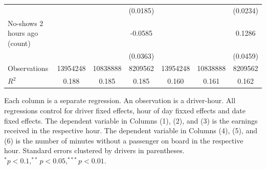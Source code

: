\documentclass[reviewmode]{AEA}
\begin{document}
\begin{table}
{\begin{tabular}{l*{6}{S}}
			                    &                     &                     &    (0.0185)         &                     &                     &    (0.0234)         \\
			\addlinespace
			No-shows 2 hours ago (count)&                     &                     &     -0.0585         &                     &                     &      0.1286\\
			                    &                     &                     &    (0.0363)         &                     &                     &    (0.0459)         \\
			\midrule
			Observations        &\num{13954248}         &\num{10838888}         &\num{8209562}         &\num{13954248}         &\num{10838888}         &\num{8209562}         \\
			$R^2$             &     {0.188}         &     {0.185}         &     {0.185}         &     {0.160}         &     {0.161}         &     {0.162}         \\
			\bottomrule
			\end{tabular}
			}

			\begin{tablenotes}
				Each column is a separate regression. An observation is a driver-hour. All regressions control for driver fixed effects, hour of day fixxed effects and date fixed effects. The dependent variable in Columns (1), (2), and (3) is the earnings received in the respective hour. The dependent variable in Columns (4), (5), and (6) is the number of minutes without a passenger on board in the respective hour. Standard errors clustered by drivers in parentheses. $^* p<0.1, ^{**} p<0.05, ^{***} p<0.01$.
			\end{tablenotes}
	\end{table}
\end{document}
